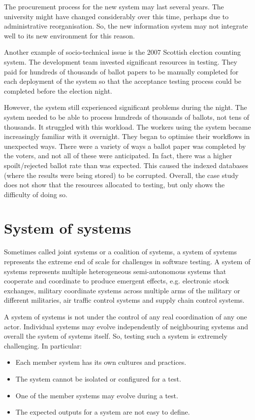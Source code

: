 \documentclass[a4paper, openany]{memoir}
\begin{document}
The procurement process for the new system may last several years. The university might have changed considerably over this time, perhaps due to administrative reorganisation. So, the new information system may not integrate well to its new environment for this reason.

Another example of socio-technical issue is the 2007 Scottish election counting system. The development team invested significant resources in testing. They paid for hundreds of thousands of ballot papers to be manually completed for each deployment of the system so that the acceptance testing process could be completed before the election night. 

However, the system still experienced significant problems during the night. The system needed to be able to process hundreds of thousands of ballots, not tens of thousands. It struggled with this workload. The workers using the system became increasingly familiar with it overnight. They began to optimise their workflows in unexpected ways. There were a variety of ways a ballot paper was completed by the voters, and not all of these were anticipated. In fact, there was a higher spoilt/rejected ballot rate than was expected. This caused the indexed databases (where the results were being stored) to be corrupted. Overall, the case study does not show that the resources allocated to testing, but only shows the difficulty of doing so.

\section{System of systems}
Sometimes called joint systems or a coalition of systems, a system of systems represents the extreme end of scale for challenges in software testing. A system of systems represents multiple heterogeneous semi-autonomous systems that cooperate and coordinate to produce emergent effects, e.g. electronic stock exchanges, military coordinate systems across multiple arms of the military or different militaries, air traffic control systems and supply chain control systems.

A system of systems is not under the control of any real coordination of any one actor. Individual systems may evolve independently of neighbouring systems and overall the system of systems itself. So, testing such a system is extremely challenging. In particular:
\begin{itemize}
    \item Each member system has its own cultures and practices.
    \item The system cannot be isolated or configured for a test.
    \item One of the member systems may evolve during a test.
    \item The expected outputs for a system are not easy to define.
\end{itemize}
\end{document}
